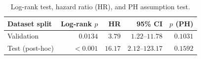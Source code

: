 \begin{table}[H]
\centering\small
\caption{Log-rank test, hazard ratio (HR), and PH assumption test.}
\label{tab:km-statistics}
\begin{tabularx}{\linewidth}{@{}Y r r r r@{}}
\toprule
\textbf{Dataset split} & \textbf{Log-rank $p$} & \textbf{HR} & \textbf{95\% CI} & \textbf{$p$ (PH)} \\
\midrule
Validation & $\mathbf{0.0134}$ & $\mathbf{3.79}$ & $1.22$--$11.78$ & $0.1031$ \\
Test (post-hoc) & $\mathbf{<0.001}$ & $\mathbf{16.17}$ & $2.12$--$123.17$ & $0.1592$ \\
\bottomrule
\end{tabularx}
\end{table}

